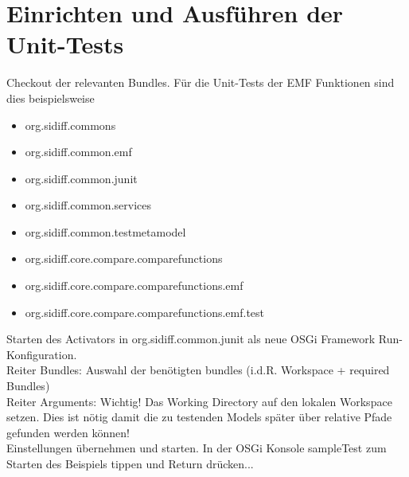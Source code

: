 %
%

\chapter{Einrichten und Ausführen der Unit-Tests}
\label{strct:intro}

Checkout der relevanten Bundles. Für die Unit-Tests der EMF Funktionen sind 
dies beispielsweise
	
\begin{itemize}
	\item org.sidiff.commons
	\item org.sidiff.common.emf
	\item org.sidiff.common.junit
	\item org.sidiff.common.services
	\item org.sidiff.common.testmetamodel
	\item org.sidiff.core.compare.comparefunctions
	\item org.sidiff.core.compare.comparefunctions.emf
	\item org.sidiff.core.compare.comparefunctions.emf.test
\end{itemize}

Starten des Activators in org.sidiff.common.junit als neue OSGi Framework
Run-Konfiguration.\\

Reiter Bundles: Auswahl der benötigten bundles (i.d.R. Workspace + required
Bundles)\\
		
Reiter Arguments: Wichtig! Das Working Directory auf den lokalen Workspace
setzen. Dies ist nötig damit die zu testenden Models später über relative
Pfade gefunden werden können!\\

Einstellungen übernehmen und starten. In der OSGi Konsole sampleTest zum 
Starten des Beispiels tippen und Return drücken...